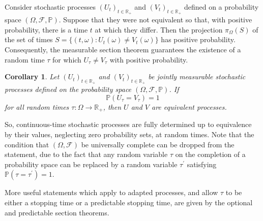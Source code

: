 \documentclass[12pt]{article}
\newtheorem*{corollary*}{Corollary}
\begin{document}
Consider stochastic processes $(U_t)_{t\in\mathbb{R}_+}$ and $(V_t)_{t\in\mathbb{R}_+}$ defined on a probability space $(\Omega,\mathcal{F},\mathbb{P})$. Suppose that they were not equivalent so that, with positive probability, there is a time $t$ at which they differ. Then the projection $\pi_\Omega(S)$ of the set of times $S=\{(t,\omega)\colon U_t(\omega)\not=V_t(\omega)\}$ has positive probability. Consequently, the measurable section theorem guarantees the existence of a random time $\tau$ for which $U_\tau\not=V_\tau$ with positive probability.

\begin{corollary*}
Let $(U_t)_{t\in\mathbb{R}_+}$ and $(V_t)_{t\in\mathbb{R}_+}$ be jointly measurable stochastic processes defined on the probability space $(\Omega,\mathcal{F},\mathbb{P})$. If
\begin{equation*}
\mathbb{P}(U_\tau=V_\tau)=1
\end{equation*}
for all random times $\tau\colon\Omega\to\mathbb{R}_+$, then $U$ and $V$ are equivalent processes.
\end{corollary*}

So, continuous-time stochastic processes are fully  determined up to equivalence by their values, neglecting zero probability sets, at random times. Note that the condition that $(\Omega,\mathcal{F})$ be universally complete can be dropped from the statement, due to the fact that any random variable $\tau$ on the completion of a probability space can be replaced by a random variable $\tau^\prime$ satisfying $\mathbb{P}(\tau=\tau^\prime)=1$.

More useful statements which apply to adapted processes, and allow $\tau$ to be either a stopping time or a predictable stopping time, are given by the optional and predictable section theorems.

\end{document}
